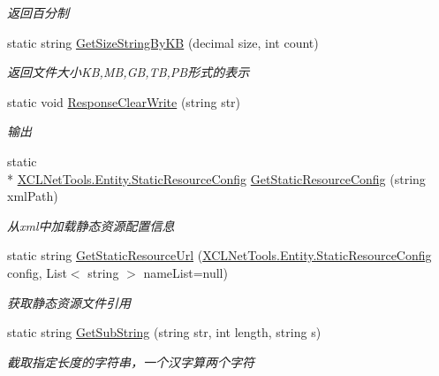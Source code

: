 \begin{DoxyCompactItemize}
\begin{DoxyCompactList}\small\item\em 返回百分制 \end{DoxyCompactList}\item 
static string \hyperlink{class_x_c_l_net_tools_1_1_string_hander_1_1_common_a4e1ade8275f7aaca63be7a5af1d5f507}{Get\-Size\-String\-By\-K\-B} (decimal size, int count)
\begin{DoxyCompactList}\small\item\em 返回文件大小\-K\-B,M\-B,G\-B,T\-B,P\-B形式的表示 \end{DoxyCompactList}\item 
static void \hyperlink{class_x_c_l_net_tools_1_1_string_hander_1_1_common_a9a36061254c3ec3898e45ade6193c745}{Response\-Clear\-Write} (string str)
\begin{DoxyCompactList}\small\item\em 输出 \end{DoxyCompactList}\item 
static \\*
\hyperlink{class_x_c_l_net_tools_1_1_entity_1_1_static_resource_config}{X\-C\-L\-Net\-Tools.\-Entity.\-Static\-Resource\-Config} \hyperlink{class_x_c_l_net_tools_1_1_string_hander_1_1_common_a67eca9ff4f18688db0b27ad91cb87ed9}{Get\-Static\-Resource\-Config} (string xml\-Path)
\begin{DoxyCompactList}\small\item\em 从xml中加载静态资源配置信息 \end{DoxyCompactList}\item 
static string \hyperlink{class_x_c_l_net_tools_1_1_string_hander_1_1_common_aab3a93f5a39ca48480843f83910fdc8f}{Get\-Static\-Resource\-Url} (\hyperlink{class_x_c_l_net_tools_1_1_entity_1_1_static_resource_config}{X\-C\-L\-Net\-Tools.\-Entity.\-Static\-Resource\-Config} config, List$<$ string $>$ name\-List=null)
\begin{DoxyCompactList}\small\item\em 获取静态资源文件引用 \end{DoxyCompactList}\item 
static string \hyperlink{class_x_c_l_net_tools_1_1_string_hander_1_1_common_a7e09ea6b3ad85e825e7623017e3e3f6b}{Get\-Sub\-String} (string str, int length, string s)
\begin{DoxyCompactList}\small\item\em 截取指定长度的字符串，一个汉字算两个字符 \end{DoxyCompactList}\item 

\end{DoxyCompactItemize}
